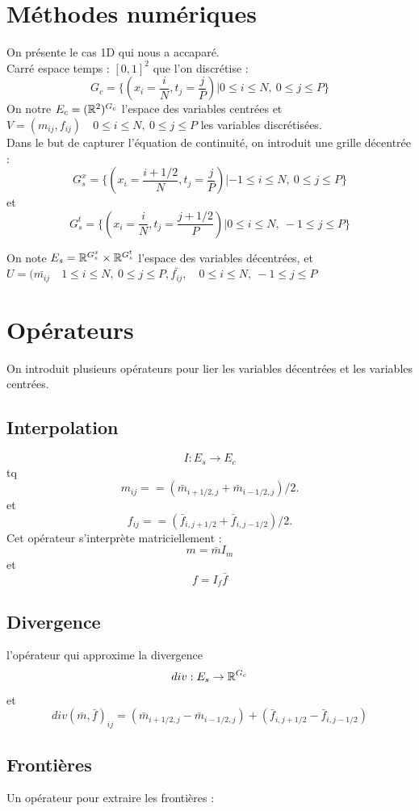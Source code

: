 \documentclass[a4paper,12pt]{article}
\begin{document}
\section{Méthodes numériques}
On présente le cas 1D qui nous a accaparé. \\
Carré espace temps : $[0,1]^2$ que l'on discrétise : 
$$
G_c = \{(x_i=\frac{i}{N},t_j=\frac{j}{P})|0\leq i\leq N,\ 0\leq j\leq P\}
$$
On notre $E_c =(\mathbb{R}^2)^{G_c}$ l'espace des variables centrées et $ V=(m_{ij},f_{ij}) \quad 0\leq i\leq N,\ 0\leq j\leq P$ les variables discrétisées. \\

Dans le but de capturer l'équation de continuité, on introduit une grille décentrée : 
$$
G_s^x = \{(x_i=\frac{i+1/2}{N},t_j=\frac{j}{P})|-1\leq i\leq N,\ 0\leq j\leq P\}
$$
et 
$$
G_s^t = \{(x_i=\frac{i}{N},t_j=\frac{j+1/2}{P})|0\leq i\leq N,\ -1\leq j\leq P\}
$$

On note $E_s=\mathbb{R}^{G_s^x}\times\mathbb{R}^{G_s^t}$ l'espace des variables décentrées, et $U=(\bar{m_{ij}}\quad 1\leq i\leq N,\ 0\leq j\leq P,\bar{f_{ij}},\quad 0\leq i\leq N,\ -1\leq j\leq P$


\section{Opérateurs}
On introduit plusieurs opérateurs pour lier les variables décentrées et les variables centrées.
\subsection{Interpolation}
$$
I:E_s \rightarrow E_c
$$
tq 
$$
m_{ij} = = (\bar{m}_{i+1/2,j}+\bar{m}_{i-1/2,j})/2.
$$
et
$$
f_{ij} = = (\bar{f}_{i,j+1/2}+\bar{f}_{i,j-1/2})/2.
$$
Cet opérateur s'interprète matriciellement : 
$$
m = \bar{m}I_m
$$
et 
$$
f = I_f\bar{f}
$$

\subsection{Divergence}
l'opérateur qui approxime la divergence
$$
div : E_s\rightarrow \mathbb{R}^{G_c}
$$
et 
$$
div(\bar{m},\bar{f})_{ij} = (\bar{m}_{i+1/2,j}-\bar{m}_{i-1/2,j}) + (\bar{f}_{i,j+1/2}-\bar{f}_{i,j-1/2})
$$

\subsection{Frontières}
Un opérateur pour extraire les frontières : 
\end{document}
